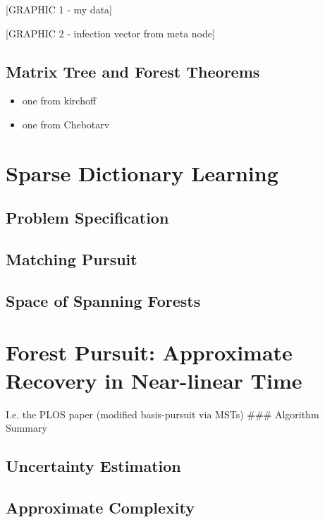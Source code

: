\documentclass[%
	12pt,
		oneside,
		letterpaper
]{book}
\providecommand{\tightlist}{%
  \setlength{\itemsep}{0pt}\setlength{\parskip}{0pt}}\usepackage{longtable,booktabs,array}
\begin{document}
{[}GRAPHIC 1 - my data{]}

{[}GRAPHIC 2 - infection vector from meta node{]}

\subsection{Matrix Tree and Forest
Theorems}\label{matrix-tree-and-forest-theorems}

\begin{itemize}
\tightlist
\item
  one from kirchoff
\item
  one from Chebotarv
\end{itemize}

\section{Sparse Dictionary Learning}\label{sparse-dictionary-learning}

\subsection{Problem Specification}\label{problem-specification}

\subsection{Matching Pursuit}\label{matching-pursuit}

\subsection{Space of Spanning Forests}\label{space-of-spanning-forests}

\section{Forest Pursuit: Approximate Recovery in Near-linear
Time}\label{sec-FP}

I.e. the PLOS paper (modified basis-pursuit via MSTs) \#\#\# Algorithm
Summary

\subsection{Uncertainty Estimation}\label{uncertainty-estimation}

\subsection{Approximate Complexity}\label{approximate-complexity}
\end{document}
